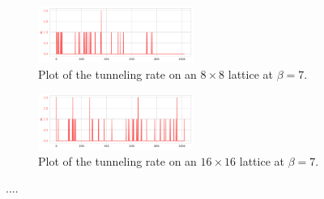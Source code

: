 \documentclass[a4paper,11pt]{article}
\begin{document}
\begin{figure}[htpb]
    \centering
    \includegraphics[width=0.45\textwidth]{assets/fthmc_dq_live_8x8_beta7.png}
    \caption{\label{fig:fthmc_dq_8x8_beta7}Plot of the tunneling rate on an
    \(8\times8\) lattice at \(\beta = 7\).}
\end{figure}
\begin{figure}[htpb]
    \centering
    \includegraphics[width=0.45\textwidth]{assets/fthmc_dq_live_16x16_xfer_beta7.png}
    \caption{\label{fig:fthmc_dq_8x8_beta7}Plot of the tunneling rate on an
    \(16 \times 16\) lattice at \(\beta = 7\).}
\end{figure}





\begin{thebibliography}{99}
....

\end{thebibliography}
\end{document}
